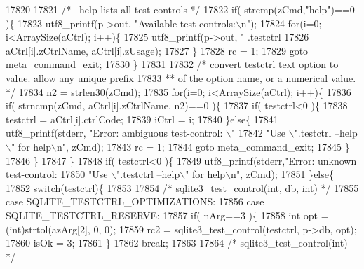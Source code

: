 \begin{DoxyCode}
{{{{{{{{{{{{{{{{{{{{{{{{{{{{{{{{{{{{{{{{{{{{{{{{{{{{{{{{{{{{{{{{{{{{{{{{{{{{{{{{{{{{{{{{{{{{{{{{{{{{{{{{{{{{{{{{{{{{{{{{{{{{{{{{{{{{{{{{{{{{{17820 
17821     \textcolor{comment}{/* --help lists all test-controls */}
17822     \textcolor{keywordflow}{if}( strcmp(zCmd,\textcolor{stringliteral}{"help"})==0 )\{
17823       utf8_printf(p->out, \textcolor{stringliteral}{"Available test-controls:\(\backslash\)n"});
17824       \textcolor{keywordflow}{for}(i=0; i<ArraySize(aCtrl); i++)\{
17825         utf8_printf(p->out, \textcolor{stringliteral}{"  .testctrl %
17826                     aCtrl[i].zCtrlName, aCtrl[i].zUsage);
17827       \}
17828       rc = 1;
17829       \textcolor{keywordflow}{goto} meta\_command\_exit;
17830     \}
17831 
17832     \textcolor{comment}{/* convert testctrl text option to value. allow any unique prefix}
17833 \textcolor{comment}{    ** of the option name, or a numerical value. */}
17834     n2 = strlen30(zCmd);
17835     \textcolor{keywordflow}{for}(i=0; i<ArraySize(aCtrl); i++)\{
17836       \textcolor{keywordflow}{if}( strncmp(zCmd, aCtrl[i].zCtrlName, n2)==0 )\{
17837         \textcolor{keywordflow}{if}( testctrl<0 )\{
17838           testctrl = aCtrl[i].ctrlCode;
17839           iCtrl = i;
17840         \}\textcolor{keywordflow}{else}\{
17841           utf8_printf(stderr, \textcolor{stringliteral}{"Error: ambiguous test-control: \(\backslash\)"%
17842                               \textcolor{stringliteral}{"Use \(\backslash\)".testctrl --help\(\backslash\)" for help\(\backslash\)n"}, zCmd);
17843           rc = 1;
17844           \textcolor{keywordflow}{goto} meta\_command\_exit;
17845         \}
17846       \}
17847     \}
17848     \textcolor{keywordflow}{if}( testctrl<0 )\{
17849       utf8_printf(stderr,\textcolor{stringliteral}{"Error: unknown test-control: %
17850                          \textcolor{stringliteral}{"Use \(\backslash\)".testctrl --help\(\backslash\)" for help\(\backslash\)n"}, zCmd);
17851     \}\textcolor{keywordflow}{else}\{
17852       \textcolor{keywordflow}{switch}(testctrl)\{
17853 
17854         \textcolor{comment}{/* sqlite3\_test\_control(int, db, int) */}
17855         \textcolor{keywordflow}{case} SQLITE_TESTCTRL_OPTIMIZATIONS:
17856         \textcolor{keywordflow}{case} SQLITE_TESTCTRL_RESERVE:
17857           \textcolor{keywordflow}{if}( nArg==3 )\{
17858             \textcolor{keywordtype}{int} opt = (int)strtol(azArg[2], 0, 0);
17859             rc2 = sqlite3_test_control(testctrl, p->db, opt);
17860             isOk = 3;
17861           \}
17862           \textcolor{keywordflow}{break};
17863 
17864         \textcolor{comment}{/* sqlite3\_test\_control(int) */}
}}}}}}}}}}}}}}}}}}}}}}}}}}}}}}}}}}}}}}}}}}}}}}}}}}}}}}}}}}}}}}}}}}}}}}}}}}}}}}}}}}}}}}}}}}}}}}}}}}}}}}}}}}}}}}}}}}}}}}}}}}}}}}}}}}}}}}}}}}}}}}}}
\end{DoxyCode}
